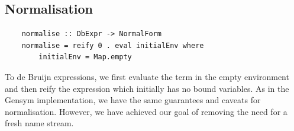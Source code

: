\subsection{Normalisation}

\begin{lstlisting}
    normalise :: DbExpr -> NormalForm
    normalise = reify 0 . eval initialEnv where
        initialEnv = Map.empty  
\end{lstlisting}

To  de Bruijn expressions, we first evaluate the term in the empty environment and then reify the expression which initially has no bound variables. As in the Gensym implementation, we have the same guarantees and caveats for normalisation. However, we have achieved our goal of removing the need for a fresh name stream.